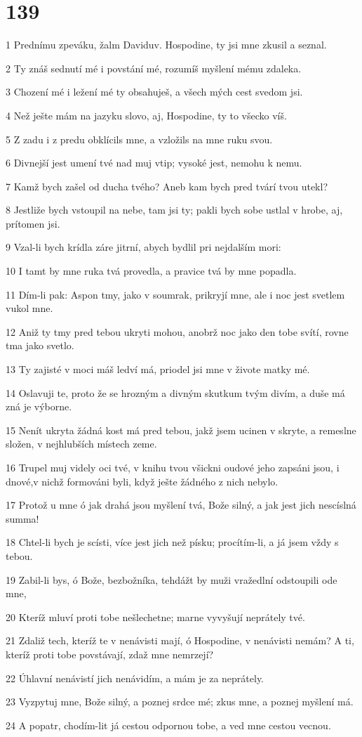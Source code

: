 \chapter{139}

\par 1 Prednímu zpeváku, žalm Daviduv. Hospodine, ty jsi mne zkusil a seznal.
\par 2 Ty znáš sednutí mé i povstání mé, rozumíš myšlení mému zdaleka.
\par 3 Chození mé i ležení mé ty obsahuješ, a všech mých cest svedom jsi.
\par 4 Než ješte mám na jazyku slovo, aj, Hospodine, ty to všecko víš.
\par 5 Z zadu i z predu obklícils mne, a vzložils na mne ruku svou.
\par 6 Divnejší jest umení tvé nad muj vtip; vysoké jest, nemohu k nemu.
\par 7 Kamž bych zašel od ducha tvého? Aneb kam bych pred tvárí tvou utekl?
\par 8 Jestliže bych vstoupil na nebe, tam jsi ty; pakli bych sobe ustlal v hrobe, aj, prítomen jsi.
\par 9 Vzal-li bych krídla záre jitrní, abych bydlil pri nejdalším mori:
\par 10 I tamt by mne ruka tvá provedla, a pravice tvá by mne popadla.
\par 11 Dím-li pak: Aspon tmy, jako v soumrak, prikryjí mne, ale i noc jest svetlem vukol mne.
\par 12 Aniž ty tmy pred tebou ukryti mohou, anobrž noc jako den tobe svítí, rovne tma jako svetlo.
\par 13 Ty zajisté v moci máš ledví má, priodel jsi mne v živote matky mé.
\par 14 Oslavuji te, proto že se hrozným a divným skutkum tvým divím, a duše má zná je výborne.
\par 15 Nenít ukryta žádná kost má pred tebou, jakž jsem ucinen v skryte, a remeslne složen, v nejhlubších místech zeme.
\par 16 Trupel muj videly oci tvé, v knihu tvou všickni oudové jeho zapsáni jsou, i dnové,v nichž formováni byli, když ješte žádného z nich nebylo.
\par 17 Protož u mne ó jak drahá jsou myšlení tvá, Bože silný, a jak jest jich nescíslná summa!
\par 18 Chtel-li bych je scísti, více jest jich než písku; procítím-li, a já jsem vždy s tebou.
\par 19 Zabil-li bys, ó Bože, bezbožníka, tehdážt by muži vražedlní odstoupili ode mne,
\par 20 Kteríž mluví proti tobe nešlechetne; marne vyvyšují neprátely tvé.
\par 21 Zdaliž tech, kteríž te v nenávisti mají, ó Hospodine, v nenávisti nemám? A ti, kteríž proti tobe povstávají, zdaž mne nemrzejí?
\par 22 Úhlavní nenávistí jich nenávidím, a mám je za neprátely.
\par 23 Vyzpytuj mne, Bože silný, a poznej srdce mé; zkus mne, a poznej myšlení má.
\par 24 A popatr, chodím-lit já cestou odpornou tobe, a ved mne cestou vecnou.

